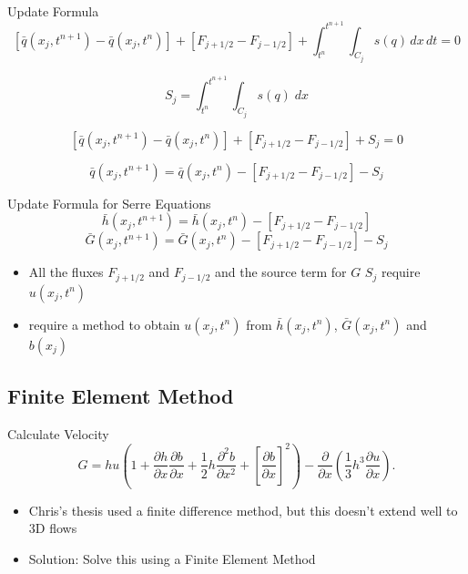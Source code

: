 \documentclass[pdf]{beamer}
\begin{document}
\begin{frame}{Update Formula}
	\begin{equation*}
	\left[\bar{q}(x_j,t^{n+1}) - \bar{q}(x_j,t^n)\right]+ \left[F_{j + 1/2} - F_{j - 1/2} \right] +  \int_{t^n}^{t^{n+1}} \int_{C_j} s(q) \, dx \, dt   = 0
	\end{equation*}
	
	\begin{equation*}
	S_{j} = \int_{t^n}^{t^{n+1}} \int_{C_j} s(q) \; dx
	\end{equation*}
	
	\begin{equation*}
	\left[\bar{q}(x_j,t^{n+1}) - \bar{q}(x_j,t^n)\right]+ \left[F_{j + 1/2} - F_{j - 1/2} \right] +  S_j  = 0
	\end{equation*}
	
	\begin{equation*}
	\bar{q}(x_j,t^{n+1})  = \bar{q}(x_j,t^n) -  \left[F_{j + 1/2} - F_{j - 1/2} \right] -  S_j
	\end{equation*}
	
\end{frame}

\begin{frame}{Update Formula for Serre Equations}
	\begin{equation*}
	\bar{h}(x_j,t^{n+1})  = \bar{h}(x_j,t^n) -  \left[F_{j + 1/2} - F_{j - 1/2} \right]
	\end{equation*}
	\begin{equation*}
	\bar{G}(x_j,t^{n+1})  = \bar{G}(x_j,t^n) -  \left[F_{j + 1/2} - F_{j - 1/2} \right] -  S_j
	\end{equation*}
	
	\begin{itemize}
		\item All the fluxes $F_{j + 1/2}$ and $F_{j - 1/2}$ and the source term for $G $ $ S_j$ require $u(x_j,t^n)$
		\item require a method to obtain $u(x_j,t^n)$ from $\bar{h}(x_j,t^n) $, $\bar{G}(x_j,t^n)$ and $b(x_j)$
	\end{itemize}
	
\end{frame}

\subsection{Finite Element Method}
\begin{frame}{Calculate Velocity}
		\[ G =  h {u} \left(1 + \frac{\partial h}{\partial x}\frac{\partial b}{\partial x} + \frac{1}{2}h\frac{\partial^2 b}{\partial x^2} + \left[\frac{\partial b}{\partial x}\right]^2 \right) - \frac{\partial}{\partial x}\left(\frac{1}{3}h^3  \frac{\partial {u}}{\partial x}\right).\]
		\begin{itemize}
			\item Chris's thesis used a finite difference method, but this doesn't extend well to 3D flows
			\item Solution: Solve this using a Finite Element Method
		\end{itemize}
\end{frame}
\end{document}
